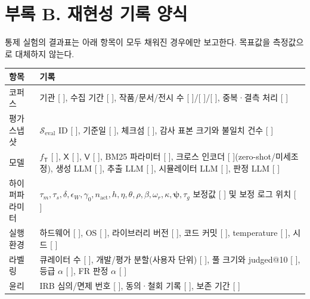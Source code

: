 \documentclass[10pt,twocolumn,letterpaper]{article}
\newcommand{\fillin}[1]{\textcolor{fillc}{[#1]}}
\newcommand{\sT}{\mathsf{T}}
\newcommand{\sX}{\mathsf{X}}
\newcommand{\sV}{\mathsf{V}}
\newcommand{\cS}{\mathcal{S}}
\begin{document}
\section*{부록 B. 재현성 기록 양식}
통제 실험의 결과표는 아래 항목이 모두 채워진 경우에만 보고한다. 목표값을 측정값으로 대체하지 않는다.

\begin{center}\small
\setlength{\tabcolsep}{5pt}
\renewcommand{\arraystretch}{1.15}
\begin{tabularx}{\textwidth}{@{}l>{\raggedright\arraybackslash}X@{}}
\toprule
항목 & 기록 \\
\midrule
코퍼스 & 기관 \fillin{ }, 수집 기간 \fillin{ }, 작품/문서/전시 수 \fillin{ }/\fillin{ }/\fillin{ }, 중복·결측 처리 \fillin{ } \\
평가 스냅샷 & $\cS_{\mathrm{eval}}$ ID \fillin{ }, 기준일 \fillin{ }, 체크섬 \fillin{ }, 감사 표본 크기와 불일치 건수 \fillin{ } \\
모델 & $f_\sT$ \fillin{ }, $\sX$ \fillin{ }, $\sV$ \fillin{ }, BM25 파라미터 \fillin{ }, 크로스 인코더 \fillin{ }(zero-shot/미세조정), 생성 LLM \fillin{ }, 추출 LLM \fillin{ }, 시뮬레이터 LLM \fillin{ }, 판정 LLM \fillin{ } \\
하이퍼파라미터 & $\tau_m,\tau_s,\delta,\epsilon_W,\gamma_0,n_{\mathrm{act}},h,\eta,\theta,\rho,\beta,\omega_r,\kappa,\bm\psi,\tau_g$ 보정값 \fillin{ } 및 보정 로그 위치 \fillin{ } \\
실행 환경 & 하드웨어 \fillin{ }, OS \fillin{ }, 라이브러리 버전 \fillin{ }, 코드 커밋 \fillin{ }, temperature \fillin{ }, 시드 \fillin{ } \\
라벨링 & 큐레이터 수 \fillin{ }, 개발/평가 분할(사용자 단위) \fillin{ }, 풀 크기와 judged@10 \fillin{ }, 등급 $\alpha$ \fillin{ }, FR 판정 $\alpha$ \fillin{ } \\
윤리 & IRB 심의/면제 번호 \fillin{ }, 동의·철회 기록 \fillin{ }, 보존 기간 \fillin{ } \\
\bottomrule
\end{tabularx}
\end{center}
\end{document}
